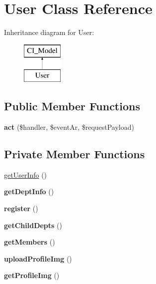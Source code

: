 \hypertarget{class_user}{\section{User Class Reference}
\label{class_user}
}
Inheritance diagram for User\-:\begin{figure}[H]
\begin{center}
\leavevmode
\includegraphics[height=2.000000cm]{class_user}
\end{center}
\end{figure}
\subsection*{Public Member Functions}
\begin{DoxyCompactItemize}
\item 
\hypertarget{class_user_a898c9f53090632c42867fddf3b754f83}{{\bfseries act} (\$handler, \$event\-Ar, \$request\-Payload)}\label{class_user_a898c9f53090632c42867fddf3b754f83}

\end{DoxyCompactItemize}
\subsection*{Private Member Functions}
\begin{DoxyCompactItemize}
\item 
\hyperlink{class_user_a73d919d58f6a3ae72c2942b7d1822216}{get\-User\-Info} ()
\item 
\hypertarget{class_user_afb482d02e60242e48174358e100962c8}{{\bfseries get\-Dept\-Info} ()}\label{class_user_afb482d02e60242e48174358e100962c8}

\item 
\hypertarget{class_user_a4fffb819502d4a1ad92eee67f5095485}{{\bfseries register} ()}\label{class_user_a4fffb819502d4a1ad92eee67f5095485}

\item 
\hypertarget{class_user_a1e530d142bd6d44fd4889d4e823cba67}{{\bfseries get\-Child\-Depts} ()}\label{class_user_a1e530d142bd6d44fd4889d4e823cba67}

\item 
\hypertarget{class_user_a8b6881613bd5448f57715f73f2d98059}{{\bfseries get\-Members} ()}\label{class_user_a8b6881613bd5448f57715f73f2d98059}

\item 
\hypertarget{class_user_a10847d511288a2cf512f1927feb45d18}{{\bfseries upload\-Profile\-Img} ()}\label{class_user_a10847d511288a2cf512f1927feb45d18}

\item 
\hypertarget{class_user_a1d6485f530105142815ffa8c6e50cb72}{{\bfseries get\-Profile\-Img} ()}\label{class_user_a1d6485f530105142815ffa8c6e50cb72}

\end{DoxyCompactItemize}
